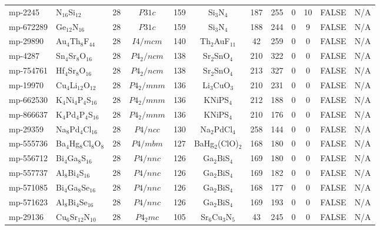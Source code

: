 {\begin{longtable}{llcccccccccc}
    mp-2245 & N$_{16}$Si$_{12}$ & 28    & $P31c$ & 159   & Si$_{3}$N$_{4}$ & 187   & 255   & 0     & 10    & FALSE & N/A \\
    mp-672289 & Ge$_{12}$N$_{16}$ & 28    & $P31c$ & 159   & Si$_{3}$N$_{4}$ & 188   & 244   & 0     & 9     & FALSE & N/A \\
    mp-29890 & Au$_{4}$Th$_{8}$F$_{44}$ & 28    & $I4/mcm$ & 140   & Th$_{2}$AuF$_{11}$ & 42    & 259   & 0     & 0     & FALSE & N/A \\
    mp-4287 & Sn$_{4}$Sr$_{8}$O$_{16}$ & 28    & $P4_2/ncm$ & 138   & Sr$_{2}$SnO$_{4}$ & 210   & 322   & 0     & 0     & FALSE & N/A \\
    mp-754761 & Hf$_{4}$Sr$_{8}$O$_{16}$ & 28    & $P4_2/ncm$ & 138   & Sr$_{2}$SnO$_{4}$ & 213   & 327   & 0     & 0     & FALSE & N/A \\
    mp-19970 & Cu$_{4}$Li$_{12}$O$_{12}$ & 28    & $P4_2/mnm$ & 136   & Li$_{3}$CuO$_{3}$ & 210   & 231   & 0     & 0     & FALSE & N/A \\
    mp-662530 & K$_{4}$Ni$_{4}$P$_{4}$S$_{16}$ & 28    & $P4_2/mnm$ & 136   & KNiPS$_{4}$ & 212   & 188   & 0     & 0     & FALSE & N/A \\
    mp-866637 & K$_{4}$Pd$_{4}$P$_{4}$S$_{16}$ & 28    & $P4_2/mnm$ & 136   & KNiPS$_{4}$ & 210   & 176   & 0     & 0     & FALSE & N/A \\
    mp-29359 & Na$_{8}$Pd$_{4}$Cl$_{16}$ & 28    & $P4/ncc$ & 130   & Na$_{2}$PdCl$_{4}$ & 258   & 144   & 0     & 0     & FALSE & N/A \\
    mp-555736 & Ba$_{4}$Hg$_{8}$Cl$_{8}$O$_{8}$ & 28    & $P4/mbm$ & 127   & BaHg$_{2}$(ClO)$_{2}$ & 168   & 180   & 0     & 0     & FALSE & N/A \\
    mp-556712 & Bi$_{4}$Ga$_{8}$S$_{16}$ & 28    & $P4/nnc$ & 126   & Ga$_{2}$BiS$_{4}$ & 169   & 180   & 0     & 0     & FALSE & N/A \\
    mp-557737 & Al$_{8}$Bi$_{4}$S$_{16}$ & 28    & $P4/nnc$ & 126   & Ga$_{2}$BiS$_{4}$ & 169   & 182   & 0     & 0     & FALSE & N/A \\
    mp-571085 & Bi$_{4}$Ga$_{8}$Se$_{16}$ & 28    & $P4/nnc$ & 126   & Ga$_{2}$BiS$_{4}$ & 168   & 177   & 0     & 0     & FALSE & N/A \\
    mp-571623 & Al$_{8}$Bi$_{4}$Se$_{16}$ & 28    & $P4/nnc$ & 126   & Ga$_{2}$BiS$_{4}$ & 169   & 193   & 0     & 0     & FALSE & N/A \\
    mp-29136 & Cu$_{6}$Sr$_{12}$N$_{10}$ & 28    & $P4_2mc$ & 105   & Sr$_{6}$Cu$_{3}$N$_{5}$ & 43    & 245   & 0     & 0     & FALSE & N/A \\

\end{longtable}}
